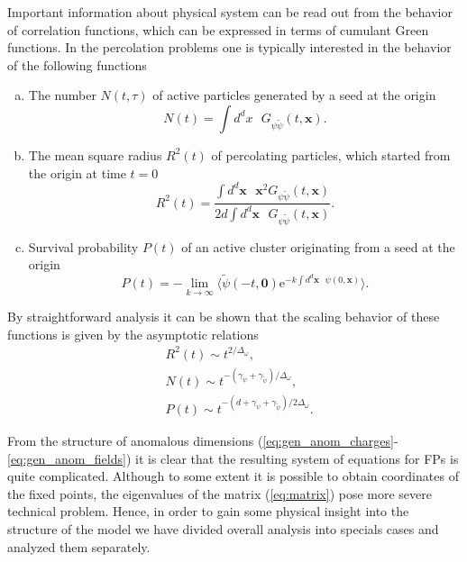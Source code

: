 \documentclass[aps,pre,url,twocolumn,superscriptaddress]{revtex4-1}
\def\eRM{{\mathrm e}}
\def\mx{{\bm x}}
\begin{document}
Important information about physical system can be read out from the behavior
of correlation functions, which can be expressed
in terms of cumulant Green functions. In the percolation problems one is typically
interested \cite{HHL08,JanTau04} in the behavior of the following functions
\begin{enumerate}[a)]
  \item The number $N(t,\tau)$ of active particles generated by a seed at the origin
        \begin{equation}
           N(t) = \int d^d x\mbox{ } G_{\psi \tilde{\psi}}(t,\mx).
           \label{eq:scale_N}
        \end{equation}
  \item The mean square radius $R^2(t)$ of percolating particles, which 
        started from the origin at time $t=0$
        \begin{equation}
           R^2(t) = \frac{\int d^d\mx\mbox{ } \mx^2 G_{\psi \tilde{\psi}}(t,\mx)}
           {2d\int d^d\mx\mbox{ }  G_{\psi \tilde{\psi}}(t,\mx) }.
           \label{eq:scale_R}
        \end{equation}
  \item Survival probability $P(t)$ of an active cluster originating
        from a seed at the origin
        \begin{equation}
           P(t) = - \lim_{k\rightarrow\infty} \langle 
           \tilde{\psi}(-t,{\bm 0}) \eRM^{-k\int d^d\mx\mbox{ } \psi(0,\mx)}
           \rangle.
           \label{eq:scale_P}
        \end{equation}
\end{enumerate}

By straightforward analysis \cite{JanTau04} it can be shown that the scaling behavior of
these functions is given by the asymptotic relations
\begin{align}
   & R^2(t) \sim %
   t^{2/\Delta_\omega},
   \\
   & N(t) \sim t^{-(\gamma_\psi +  \gamma_{\tilde{\psi}})/\Delta_\omega},\\
   & P(t) \sim t^{-(d+\gamma_\psi +  \gamma_{\tilde{\psi}})/2\Delta_\omega} .
   \label{eq:scalingGF}
\end{align}

From the structure of anomalous dimensions 
(\ref{eq:gen_anom_charges}-\ref{eq:gen_anom_fields}) it is clear that the
resulting system of equations for FPs is quite complicated. Although
to some extent it is possible to obtain coordinates of the fixed points, the
eigenvalues of the matrix (\ref{eq:matrix}) pose more severe technical problem.
Hence, in order to gain some physical insight into the 
structure of the model we have divided overall analysis into specials cases and
analyzed them separately.
\end{document}
